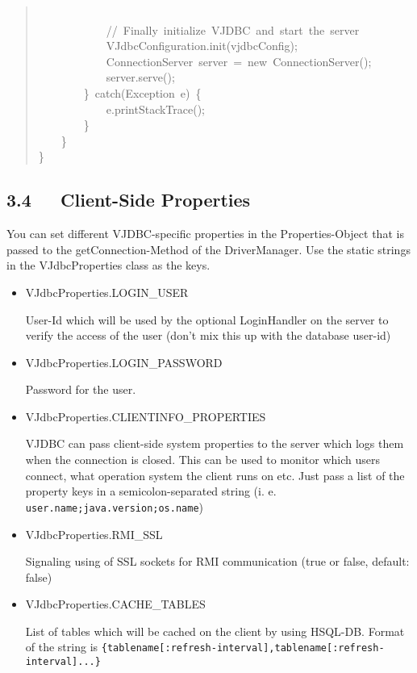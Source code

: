 \documentclass[10pt,a4paper,english]{article}
\begin{document}
\begin{quote}
{~\\
~~~~~~~~~~~~//~Finally~initialize~VJDBC~and~start~the~server~\\
~~~~~~~~~~~~VJdbcConfiguration.init(vjdbcConfig);~\\
~~~~~~~~~~~~ConnectionServer~server~=~new~ConnectionServer();~\\
~~~~~~~~~~~~server.serve();~\\
~~~~~~~~{\}}~catch(Exception~e)~{\{}~\\
~~~~~~~~~~~~e.printStackTrace();~\\
~~~~~~~~{\}}~\\
~~~~{\}}~\\
{\}}
}\end{quote}



\hypertarget{client-side-properties}{}
\subsection*{3.4~~~Client-Side Properties}

You can set different VJDBC-specific properties in the Properties-Object that is passed to the getConnection-Method of the DriverManager. Use the static strings in the VJdbcProperties class as the keys.
\begin{itemize}
\item {} 
VJdbcProperties.LOGIN{\_}USER

User-Id which will be used by the optional LoginHandler on the server to verify the access of the user (don't mix this up with the database user-id)

\item {} 
VJdbcProperties.LOGIN{\_}PASSWORD

Password for the user.

\item {} 
VJdbcProperties.CLIENTINFO{\_}PROPERTIES

VJDBC can pass client-side system properties to the server which logs them when the connection is closed. This can be used to monitor which users connect, what operation system the client runs on etc. Just pass a list of the property keys in a semicolon-separated string (i. e. \texttt{user.name;java.version;os.name})

\item {} 
VJdbcProperties.RMI{\_}SSL

Signaling using of SSL sockets for RMI communication (true or false, default: false)

\item {} 
VJdbcProperties.CACHE{\_}TABLES

List of tables which will be cached on the client by using HSQL-DB. Format of the string is \texttt{{\{}tablename{[}:refresh-interval],tablename{[}:refresh-interval]...{\}}}

\end{itemize}
\end{document}
